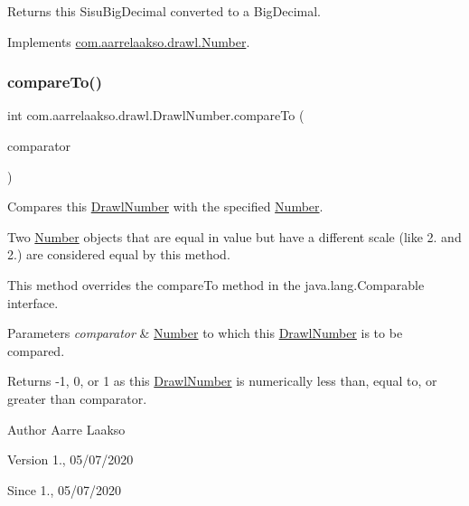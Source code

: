 \begin{DoxyReturn}{Returns}
this Sisu\+Big\+Decimal converted to a Big\+Decimal. 
\end{DoxyReturn}


Implements \hyperlink{interfacecom_1_1aarrelaakso_1_1drawl_1_1_number_a88d32e8ed7137662dc845ac6937107e6}{com.\+aarrelaakso.\+drawl.\+Number}.

\mbox{\label{classcom_1_1aarrelaakso_1_1drawl_1_1_drawl_number_a40d2c6535f85306aaf5b6e5886c51266}} 
\subsubsection{\texorpdfstring{compare\+To()}{compareTo()}}
{\footnotesize\ttfamily int com.\+aarrelaakso.\+drawl.\+Drawl\+Number.\+compare\+To (\begin{DoxyParamCaption}\item[{@Not\+Null final \hyperlink{interfacecom_1_1aarrelaakso_1_1drawl_1_1_number}{Number}}]{comparator }\end{DoxyParamCaption})}



Compares this \hyperlink{classcom_1_1aarrelaakso_1_1drawl_1_1_drawl_number}{Drawl\+Number} with the specified \hyperlink{interfacecom_1_1aarrelaakso_1_1drawl_1_1_number}{Number}. 

Two \hyperlink{interfacecom_1_1aarrelaakso_1_1drawl_1_1_number}{Number} objects that are equal in value but have a different scale (like 2. and 2.) are considered equal by this method. 

This method overrides the compare\+To method in the java.\+lang.\+Comparable interface.


\begin{DoxyParams}{Parameters}
{\em comparator} & \hyperlink{interfacecom_1_1aarrelaakso_1_1drawl_1_1_number}{Number} to which this \hyperlink{classcom_1_1aarrelaakso_1_1drawl_1_1_drawl_number}{Drawl\+Number} is to be compared. \\
\hline
\end{DoxyParams}
\begin{DoxyReturn}{Returns}
-\/1, 0, or 1 as this \hyperlink{classcom_1_1aarrelaakso_1_1drawl_1_1_drawl_number}{Drawl\+Number} is numerically less than, equal to, or greater than comparator. 
\end{DoxyReturn}
\begin{DoxyAuthor}{Author}
Aarre Laakso 
\end{DoxyAuthor}
\begin{DoxyVersion}{Version}
1., 05/07/2020 
\end{DoxyVersion}
\begin{DoxySince}{Since}
1., 05/07/2020 
\end{DoxySince}



